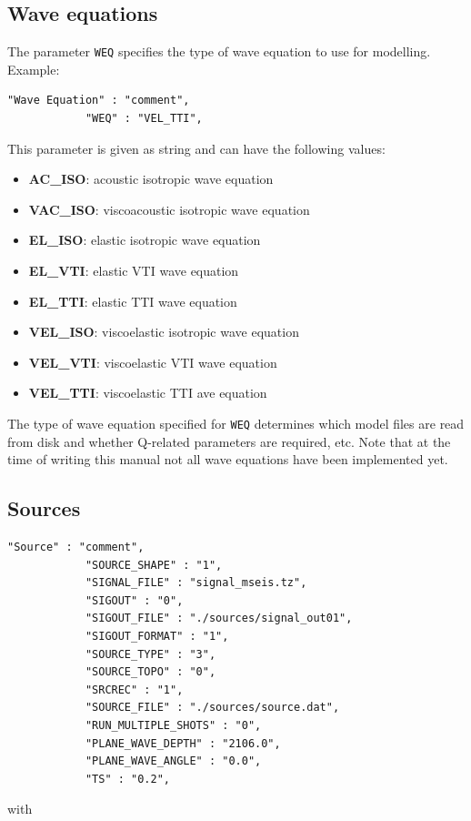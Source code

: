 \subsection{Wave equations}
The parameter \texttt{WEQ} specifies the type of wave equation to use for modelling. Example:
\begin{verbatim}
"Wave Equation" : "comment",
            "WEQ" : "VEL_TTI",
\end{verbatim}
This parameter is given as string and can have the following values:
\begin{itemize}
\item \textbf{AC\_ISO}: acoustic isotropic wave equation
\item \textbf{VAC\_ISO}: viscoacoustic isotropic wave equation
\item \textbf{EL\_ISO}: elastic isotropic wave equation
\item \textbf{EL\_VTI}: elastic VTI wave equation
\item \textbf{EL\_TTI}: elastic TTI wave equation
\item \textbf{VEL\_ISO}: viscoelastic isotropic wave equation
\item \textbf{VEL\_VTI}: viscoelastic VTI wave equation
\item \textbf{VEL\_TTI}: viscoelastic TTI ave equation
\end{itemize}
The type of wave equation specified for \texttt{WEQ} determines which model files are read from disk and whether Q-related parameters are required, etc. Note that at the time of writing this manual not all wave equations have been implemented yet.

\subsection{Sources}
\label{sources}
\begin{verbatim}
"Source" : "comment",
            "SOURCE_SHAPE" : "1",
            "SIGNAL_FILE" : "signal_mseis.tz",
            "SIGOUT" : "0",
            "SIGOUT_FILE" : "./sources/signal_out01",
            "SIGOUT_FORMAT" : "1",
            "SOURCE_TYPE" : "3",
            "SOURCE_TOPO" : "0",
            "SRCREC" : "1",
            "SOURCE_FILE" : "./sources/source.dat",
            "RUN_MULTIPLE_SHOTS" : "0",
            "PLANE_WAVE_DEPTH" : "2106.0",
            "PLANE_WAVE_ANGLE" : "0.0",
            "TS" : "0.2",
\end{verbatim}

with

